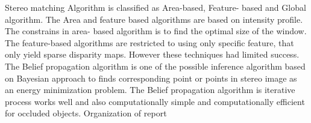 Stereo matching Algorithm is classified as Area-based, Feature- based and Global algorithm. The Area and feature based algorithms are based on intensity profile. The constrains in area- based algorithm is to find the optimal size of the window. The feature-based algorithms are restricted to using only specific feature, that only yield sparse disparity maps. However these techniques had limited success.\\
The Belief propagation algorithm is one of the possible inference algorithm based on Bayesian approach to finds corresponding point or points in stereo image as an energy minimization problem. The Belief propagation algorithm is iterative process works well and also computationally simple and computationally efficient for occluded objects.
Organization of report
